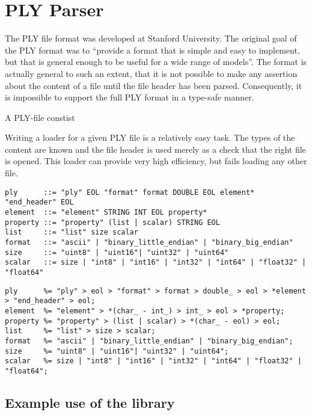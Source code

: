 \section{PLY Parser}

The PLY file format was developed at Stanford University. The original goal of
the PLY format was to ``provide a format that is simple and easy to implement,
but that is general enough to be useful for a wide range of models''. The format
is actually general to such an extent, that it is not possible to make any
assertion about the content of a file until the file header has been parsed.
Consequently, it is impossible to support the full PLY format in a type-safe
manner.

A PLY-file constist


Writing a loader for a given PLY file is a relatively easy task. The types of
the content are known and the file header is used merely as a check that the
right file is opened. This loader can provide very high efficiency, but fails
loading any other file.

\begin{lstlisting}[float=*,frame=tb,caption=EBNF Grammar of the PLY file header]
ply      ::= "ply" EOL "format" format DOUBLE EOL element* "end_header" EOL
element  ::= "element" STRING INT EOL property*
property ::= "property" (list | scalar) STRING EOL
list     ::= "list" size scalar
format   ::= "ascii" | "binary_little_endian" | "binary_big_endian"
size     ::= "uint8" | "uint16"| "uint32" | "uint64"
scalar   ::= size | "int8" | "int16" | "int32" | "int64" | "float32" | "float64"
\end{lstlisting}

\begin{lstlisting}[float=*,frame=tb,caption=C++ Grammar of the PLY file header]
ply      %= "ply" > eol > "format" > format > double_ > eol > *element > "end_header" > eol;
element  %= "element" > *(char_ - int_) > int_ > eol > *property;
property %= "property" > (list | scalar) > *(char_ - eol) > eol;
list     %= "list" > size > scalar;
format   %= "ascii" | "binary_little_endian" | "binary_big_endian";
size     %= "uint8" | "uint16"| "uint32" | "uint64";
scalar   %= size | "int8" | "int16" | "int32" | "int64" | "float32" | "float64";
\end{lstlisting}

\subsection{Example use of the library}

